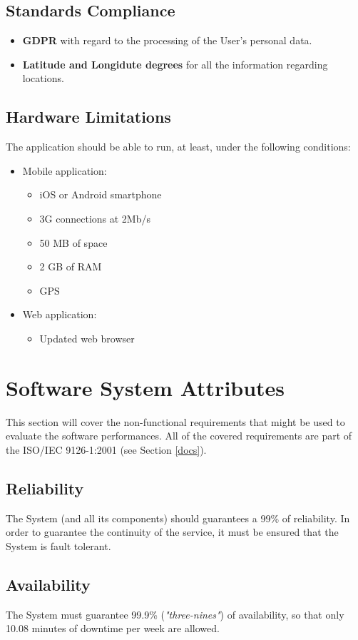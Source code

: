 \documentclass{report}
\begin{document}
\subsection{Standards Compliance}
\begin{itemize}
	\item \textbf{GDPR} with regard to the processing of the User's personal data.
	\item \textbf{Latitude and Longidute degrees} for all the information regarding locations.
\end{itemize}
\subsection{Hardware Limitations}
The application should be able to run, at least, under the following conditions:
\begin{itemize}
	\item Mobile application:
	\begin{itemize}
		\item iOS or Android smartphone
		\item 3G connections at 2Mb/s
		\item 50 MB of space
		\item 2 GB of RAM
		\item GPS
	\end{itemize}
	\item Web application:
	\begin{itemize}
		\item Updated web browser
	\end{itemize} 
\end{itemize}
\section{Software System Attributes}
This section will cover the non-functional requirements that might be used to evaluate the software performances. All of the covered requirements are part of the ISO/IEC 9126-1:2001 (see Section \ref{docs}).
\subsection{Reliability}
The System (and all its components) should guarantees a 99\% of reliability. In order to guarantee the continuity of the service, it must be ensured that the System is fault tolerant.
\subsection{Availability}
The System must guarantee 99.9\% (\textit{"three-nines"}) of availability, so that only 10.08 minutes of downtime per week are allowed. 
\end{document}

